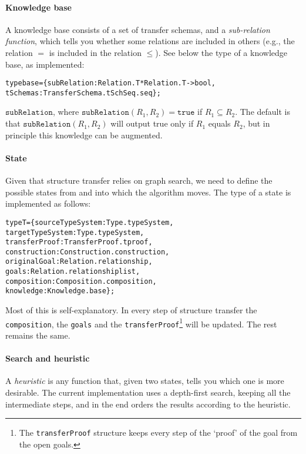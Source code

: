 \documentclass[a4paper]{article}
\theoremstyle{definition}
\begin{document}
	\paragraph{Knowledge base} A knowledge base consists of a set of transfer schemas, and a \textit{sub-relation function}, which tells you whether some relations are included in others (e.g., the relation $=$ is included in the relation $\leq$). See below the type of a knowledge base, as implemented:
	\begin{alltt}
type base = \{subRelation : Relation.T * Relation.T -> bool,
             tSchemas : TransferSchema.tSch Seq.seq\};
	\end{alltt}
	 $\mathtt{subRelation}$, where $\mathtt{subRelation}(R_1,R_2) = \mathtt{true}$ if $R_1 \subseteq R_2$. The default is that $\mathtt{subRelation}(R_1,R_2)$ will output true only if $R_1$ equals $R_2$, but in principle this knowledge can be augmented.

	\paragraph{State}
	 Given that structure transfer relies on graph search, we need to define the possible states from and into which the algorithm moves. The type of a state is implemented as follows:
\begin{alltt}
type T = \{sourceTypeSystem : Type.typeSystem,
          targetTypeSystem : Type.typeSystem,
          transferProof : TransferProof.tproof,
          construction : Construction.construction,
          originalGoal : Relation.relationship,
          goals : Relation.relationship list,
          composition : Composition.composition,
          knowledge : Knowledge.base\};
\end{alltt}
	Most of this is self-explanatory.
	In every step of structure transfer the \texttt{composition}, the \texttt{goals} and the \texttt{transferProof}\footnote{The \texttt{transferProof} structure keeps every step of the `proof' of the goal from the open goals.} will be updated. The rest remains the same.

	\paragraph{Search and heuristic}
	A \textit{heuristic} is any function that, given two states, tells you which one is more desirable. The current implementation uses a depth-first search, keeping all the intermediate steps, and in the end orders the results according to the heuristic.
\end{document}
